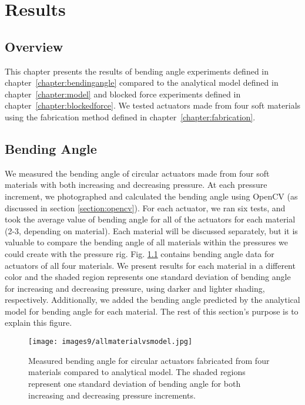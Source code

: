 \chapter{Results}
\section{Overview}
This chapter presents the results of bending angle experiments defined in chapter~\ref{chapter:bendingangle} compared to the analytical model defined in chapter~\ref{chapter:model} and blocked force experiments defined in chapter~\ref{chapter:blockedforce}. We tested actuators made from four soft materials using the fabrication method defined in chapter~\ref{chapter:fabrication}.

\section{Bending Angle}

We measured the bending angle of circular actuators made from four soft materials with both increasing and decreasing pressure. At each pressure increment, we photographed and calculated the bending angle using OpenCV (as discussed in section \ref{section:opencv}). For each actuator, we ran six tests, and took the average value of bending angle for all of the actuators for each material (2-3, depending on material). Each material will be discussed separately, but it is valuable to compare the bending angle of all materials within the pressures we could create with the pressure rig. Fig. \ref{fig:allmaterialvsmodel} contains bending angle data for actuators of all four materials. We present results for each material in a different color and the shaded region represents one standard deviation of bending angle for increasing and decreasing pressure, using darker and lighter shading, respectively. Additionally, we added the bending angle predicted by the analytical model for bending angle for each material. The rest of this section's purpose is to explain this figure. 

\begin{figure}[ht]
    \centering
     \texttt{[image: images9/allmaterialvsmodel.jpg]}
    \caption{Measured bending angle for circular actuators fabricated from four materials compared to analytical model. The shaded regions represent one standard deviation of bending angle for both increasing and decreasing pressure increments.}
    \label{fig:allmaterialvsmodel}
\end{figure}

